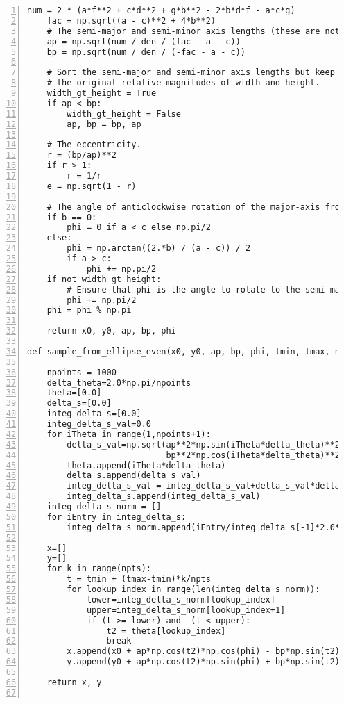 \documentclass[oneside,10pt]{book}
\begin{document}
\begin{lstlisting}[numbers=left]
    num = 2 * (a*f**2 + c*d**2 + g*b**2 - 2*b*d*f - a*c*g)
    fac = np.sqrt((a - c)**2 + 4*b**2)
    # The semi-major and semi-minor axis lengths (these are not sorted).
    ap = np.sqrt(num / den / (fac - a - c))
    bp = np.sqrt(num / den / (-fac - a - c))

    # Sort the semi-major and semi-minor axis lengths but keep track of
    # the original relative magnitudes of width and height.
    width_gt_height = True
    if ap < bp:
        width_gt_height = False
        ap, bp = bp, ap

    # The eccentricity.
    r = (bp/ap)**2
    if r > 1:
        r = 1/r
    e = np.sqrt(1 - r)

    # The angle of anticlockwise rotation of the major-axis from x-axis.
    if b == 0:
        phi = 0 if a < c else np.pi/2
    else:
        phi = np.arctan((2.*b) / (a - c)) / 2
        if a > c:
            phi += np.pi/2
    if not width_gt_height:
        # Ensure that phi is the angle to rotate to the semi-major axis.
        phi += np.pi/2
    phi = phi % np.pi

    return x0, y0, ap, bp, phi

def sample_from_ellipse_even(x0, y0, ap, bp, phi, tmin, tmax, npts):

    npoints = 1000
    delta_theta=2.0*np.pi/npoints
    theta=[0.0]
    delta_s=[0.0]
    integ_delta_s=[0.0]
    integ_delta_s_val=0.0
    for iTheta in range(1,npoints+1):
        delta_s_val=np.sqrt(ap**2*np.sin(iTheta*delta_theta)**2+ \
                            bp**2*np.cos(iTheta*delta_theta)**2)
        theta.append(iTheta*delta_theta)
        delta_s.append(delta_s_val)
        integ_delta_s_val = integ_delta_s_val+delta_s_val*delta_theta
        integ_delta_s.append(integ_delta_s_val)
    integ_delta_s_norm = []
    for iEntry in integ_delta_s:
        integ_delta_s_norm.append(iEntry/integ_delta_s[-1]*2.0*np.pi)    
    
    x=[]
    y=[] 
    for k in range(npts):
        t = tmin + (tmax-tmin)*k/npts
        for lookup_index in range(len(integ_delta_s_norm)):
            lower=integ_delta_s_norm[lookup_index]
            upper=integ_delta_s_norm[lookup_index+1]
            if (t >= lower) and  (t < upper):
                t2 = theta[lookup_index]
                break    
        x.append(x0 + ap*np.cos(t2)*np.cos(phi) - bp*np.sin(t2)*np.sin(phi))
        y.append(y0 + ap*np.cos(t2)*np.sin(phi) + bp*np.sin(t2)*np.cos(phi))

    return x, y


\end{lstlisting}
\end{document}
